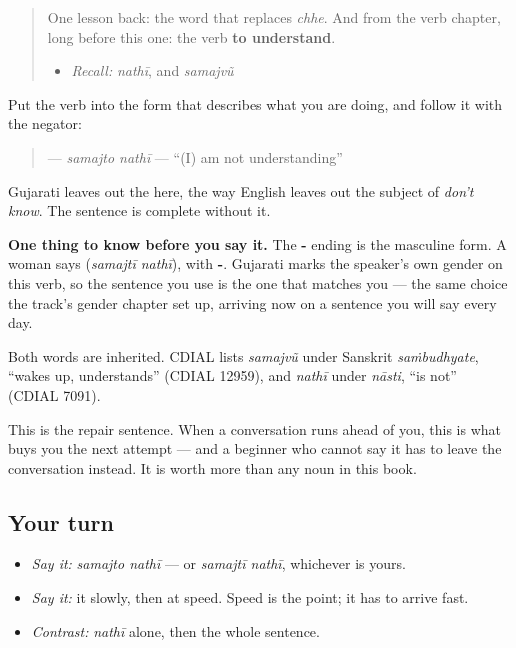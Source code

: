 \label{lesson:GU-C31-samajto-nathi}



\begin{quote}
One lesson back: the word that replaces \emph{chhe}. And from the verb chapter, long before this one: the verb \textbf{to understand}.

\begin{itemize}
\raggedright
  \item \emph{Recall:} \emph{nathī}, and \emph{samajvũ}
\end{itemize}
\end{quote}

\begin{cousinweb}
Put the verb into the form that describes what you are doing, and follow it with the negator:

\begin{quote}
\textbf{ } — \emph{samajto nathī} — \textquotedblleft{}(I) am not understanding\textquotedblright{}
\end{quote}

Gujarati leaves out the \textbf{} here, the way English leaves out the subject of \emph{don't know}. The sentence is complete without it.

\textbf{One thing to know before you say it.} The \textbf{-} ending is the masculine form. A woman says \textbf{ } (\emph{samajtī nathī}), with \textbf{-}. Gujarati marks the speaker's own gender on this verb, so the sentence you use is the one that matches you — the same choice the track's gender chapter set up, arriving now on a sentence you will say every day.

Both words are inherited. CDIAL lists \emph{samajvũ} under Sanskrit \emph{saṁbudhyate}, \textquotedblleft{}wakes up, understands\textquotedblright{} (CDIAL 12959), and \emph{nathī} under \emph{nāsti}, \textquotedblleft{}is not\textquotedblright{} (CDIAL 7091).
\end{cousinweb}

\begin{culture}
This is the repair sentence. When a conversation runs ahead of you, this is what buys you the next attempt — and a beginner who cannot say it has to leave the conversation instead. It is worth more than any noun in this book.
\end{culture}

\subsection*{Your turn}
\begin{itemize}
\raggedright
  \item \emph{Say it:} \emph{samajto nathī} — or \emph{samajtī nathī}, whichever is yours.
  \item \emph{Say it:} it slowly, then at speed. Speed is the point; it has to arrive fast.
  \item \emph{Contrast:} \emph{nathī} alone, then the whole sentence.
\end{itemize}

